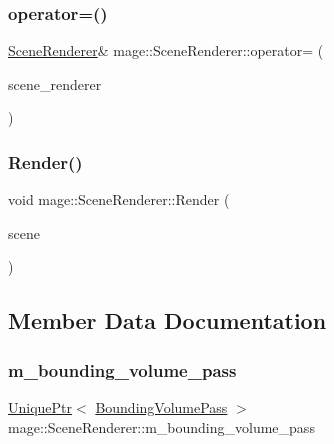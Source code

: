\subsubsection{\texorpdfstring{operator=()}{operator=()}\hspace{0.1cm}{\footnotesize\ttfamily [2/2]}}
{\footnotesize\ttfamily \hyperlink{classmage_1_1_scene_renderer}{Scene\+Renderer}\& mage\+::\+Scene\+Renderer\+::operator= (\begin{DoxyParamCaption}\item[{\hyperlink{classmage_1_1_scene_renderer}{Scene\+Renderer} \&\&}]{scene\+\_\+renderer }\end{DoxyParamCaption})\hspace{0.3cm}{\ttfamily [delete]}}

\hypertarget{classmage_1_1_scene_renderer_aa7825b36b1c9e0d22cbd49a9df5e73e4}{}\label{classmage_1_1_scene_renderer_aa7825b36b1c9e0d22cbd49a9df5e73e4} 
\subsubsection{\texorpdfstring{Render()}{Render()}}
{\footnotesize\ttfamily void mage\+::\+Scene\+Renderer\+::\+Render (\begin{DoxyParamCaption}\item[{const \hyperlink{classmage_1_1_scene}{Scene} $\ast$}]{scene }\end{DoxyParamCaption})}



\subsection{Member Data Documentation}
\hypertarget{classmage_1_1_scene_renderer_a9d10194ae2ab807b241b078f8bb6430a}{}\label{classmage_1_1_scene_renderer_a9d10194ae2ab807b241b078f8bb6430a} 
\subsubsection{\texorpdfstring{m\+\_\+bounding\+\_\+volume\+\_\+pass}{m\_bounding\_volume\_pass}}
{\footnotesize\ttfamily \hyperlink{namespacemage_a3316d7143a973e37adf1110f2e80ca31}{Unique\+Ptr}$<$ \hyperlink{classmage_1_1_bounding_volume_pass}{Bounding\+Volume\+Pass} $>$ mage\+::\+Scene\+Renderer\+::m\+\_\+bounding\+\_\+volume\+\_\+pass\hspace{0.3cm}{\ttfamily [private]}}

